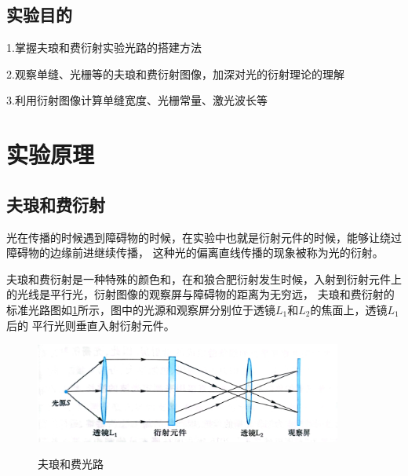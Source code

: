\documentclass{ctexart}
\begin{document}
  \subsection{实验目的}
  1.\quad 掌握夫琅和费衍射实验光路的搭建方法

  2.\quad 观察单缝、光栅等的夫琅和费衍射图像，加深对光的衍射理论的理解

  3.\quad 利用衍射图像计算单缝宽度、光栅常量、激光波长等


\section{实验原理}
  \subsection{夫琅和费衍射}
  光在传播的时候遇到障碍物的时候，在实验中也就是衍射元件的时候，能够让绕过障碍物的边缘前进继续传播，
  这种光的偏离直线传播的现象被称为光的衍射。

  夫琅和费衍射是一种特殊的颜色和，在和狼合肥衍射发生时候，入射到衍射元件上的光线是平行光，衍射图像的观察屏与障碍物的距离为无穷远，
  夫琅和费衍射的标准光路图如\ref{flhfguanglu}所示，图中的光源和观察屏分别位于透镜$L_{1}$和$L_{2}$的焦面上，透镜$L_{1}$后的
  平行光则垂直入射衍射元件。

\begin{figure}[H]
  \centering\label{flhfguanglu}
  \includegraphics[width=0.9\textwidth,height=0.2\textheight]{flhfguanglu.jpg}
  \caption{夫琅和费光路}
\end{figure}
\end{document}

